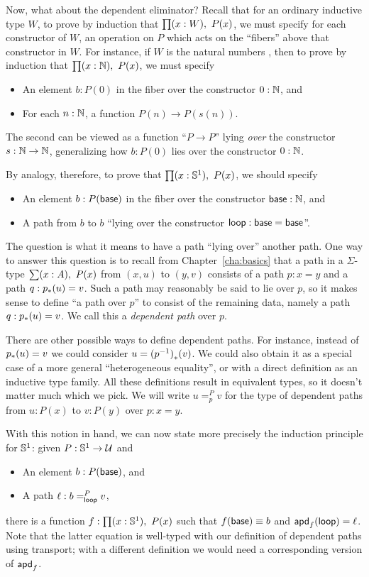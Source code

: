 Now, what about the dependent eliminator?
Recall that for an ordinary inductive type $W$, to prove by induction that $\prd{x:W} P(x)$, we must specify for each constructor of $W$, an operation on $P$ which acts on the ``fibers'' above that constructor in $W$.
For instance, if $W$ is the natural numbers \nat, then to prove by induction that $\prd{x:\nat} P(x)$, we must specify
\begin{itemize}
\item An element $b:P(0)$ in the fiber over the constructor $0:\mathbb{N}$, and
\item For each $n:\mathbb{N}$, a function $P(n) \to P(s(n))$.
\end{itemize}
The second can be viewed as a function ``$P\to P$'' lying \emph{over} the constructor $s:\mathbb{N}\to\mathbb{N}$, generalizing how $b:P(0)$ lies over the constructor $0:\mathbb{N}$.

By analogy, therefore, to prove that $\prd{x:\Sn^1} P(x)$, we should specify
\begin{itemize}
\item An element $b:P(\mathsf{base})$ in the fiber over the constructor $\mathsf{base}:\mathbb{N}$, and
\item A path from $b$ to $b$ ``lying over the constructor $\mathsf{loop}:\mathsf{base}=\mathsf{base}$''.
\end{itemize}
The question is what it means to have a path ``lying over'' another path.
One way to answer this question is to recall from Chapter~\ref{cha:basics} that a path in a $\Sigma$-type $\sm{x:A} P(x)$ from $(x,u)$ to $(y,v)$ consists of a path $p:x=y$ and a path $q:{p}_{*}\!\left({u}\right) = v$.
Such a path may reasonably be said to lie over $p$, so it makes sense to define ``a path over $p$'' to consist of the remaining data, namely a path $q:{p}_{*}\!\left({u}\right) = v$.
We call this a \emph{dependent path} over $p$.

There are other possible ways to define dependent paths.
For instance, instead of ${p}_{*}\!\left({u}\right) = v$ we could consider $u = {(\mathord{{p}^{-1}})}_{*}\!\left({v}\right)$.
We could also obtain it as a special case of a more general ``heterogeneous equality'', or with a direct definition as an inductive type family.
All these definitions result in equivalent types, so it doesn't matter much which we pick.
We will write $u =^P_p v$ for the type of dependent paths from $u:P(x)$ to $v:P(y)$ over $p:x=y$.

With this notion in hand, we can now state more precisely the induction principle for $\mathbb{S}^1$: given $P:\mathbb{S}^1\to\mathcal{U}$ and
\begin{itemize}
\item An element $b:P(\mathsf{base})$, and
\item A path $\ell : b =^P_{\mathsf{loop}} v$,
\end{itemize}
there is a function $f:\prd{x:\Sn^1} P(x)$ such that $f(\mathsf{base})\equiv b$ and $\mathsf{apd}_{f} (\mathsf{loop}) = \ell$.
Note that the latter equation is well-typed with our definition of dependent paths using transport; with a different definition we would need a corresponding version of $\mathsf{apd}_{f}$.

